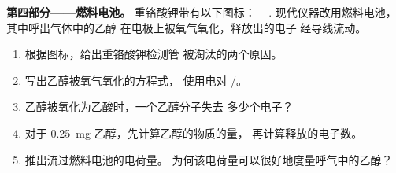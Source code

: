 \begin{problem}
\medskip
\noindent\textbf{第四部分——燃料电池。}
重铬酸钾带有以下图标：
\,\,\,\,\,.
现代仪器改用燃料电池，其中呼出气体中的乙醇
在电极上被氧气氧化，释放出的电子
经导线流动。
\begin{enumerate}[resume]
  \item 根据图标，给出重铬酸钾检测管
        被淘汰的两个原因。
  \item 写出乙醇被氧气氧化的方程式，
        使用电对 /。
  \item 乙醇被氧化为乙酸时，一个乙醇分子失去
        多少个电子？
  \item 对于 \qty{0.25}{mg} 乙醇，先计算乙醇的物质的量，
        再计算释放的电子数。
  \item 推出流过燃料电池的电荷量。
        为何该电荷量可以很好地度量呼气中的乙醇？
\end{enumerate}
\end{problem}
